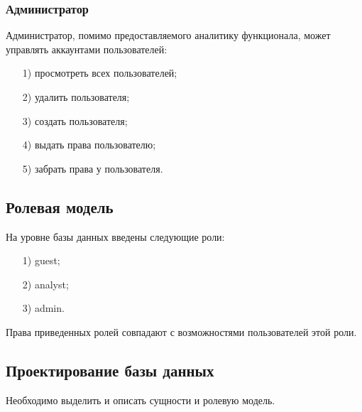 \subsubsection{Администратор}
Администратор, помимо предоставляемого аналитику функционала, может управлять аккаунтами пользователей:
\begin{itemize}
	\item[1)] просмотреть всех пользователей;
	\item[2)] удалить пользователя; 
	\item[3)] создать пользователя;
	\item[4)] выдать права пользователю;
	\item[5)] забрать права у пользователя. 
\end{itemize}

\subsection{Ролевая модель}
На уровне базы данных введены следующие роли:
\begin{itemize}
	\item[1)] guest;
	\item[2)] analyst;
	\item[3)] admin.
\end{itemize}
Права приведенных ролей совпадают с возможностями пользователей этой роли.


\subsection{Проектирование базы данных}
Необходимо выделить и описать сущности и ролевую модель.
